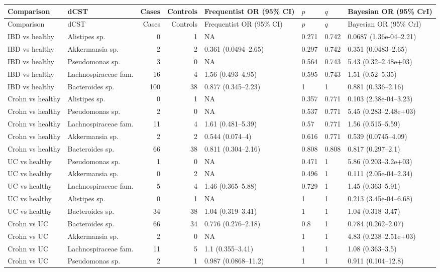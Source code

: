 \begingroup
\scriptsize
\setlength{\tabcolsep}{3pt}
\setlength{\LTleft}{0pt}
\setlength{\LTright}{0pt}
\begin{longtable}{@{} p{} p{} r r p{} p{} p{} p{} @{}}
\toprule
Comparison & dCST & Cases & Controls & Frequentist OR (95\% CI) & \(p\) & \(q\) & Bayesian OR (95\% CrI) \\
\midrule
\endfirsthead
\toprule
Comparison & dCST & Cases & Controls & Frequentist OR (95\% CI) & \(p\) & \(q\) & Bayesian OR (95\% CrI) \\
\midrule
\endhead
\bottomrule
\endfoot
IBD vs healthy & Alistipes sp. & 0 & 1 & NA & 0.271 & 0.742 & 0.0687 (1.36e-04--2.21) \\
IBD vs healthy & Akkermansia sp. & 2 & 2 & 0.361 (0.0494--2.65) & 0.297 & 0.742 & 0.351 (0.0483--2.65) \\
IBD vs healthy & Pseudomonas sp. & 3 & 0 & NA & 0.564 & 0.743 & 5.43 (0.32--2.48e+03) \\
IBD vs healthy & Lachnospiraceae fam. & 16 & 4 & 1.56 (0.493--4.95) & 0.595 & 0.743 & 1.51 (0.52--5.35) \\
IBD vs healthy & Bacteroides sp. & 100 & 38 & 0.877 (0.345--2.23) & 1 & 1 & 0.881 (0.336--2.16) \\
Crohn vs healthy & Alistipes sp. & 0 & 1 & NA & 0.357 & 0.771 & 0.103 (2.38e-04--3.23) \\
Crohn vs healthy & Pseudomonas sp. & 2 & 0 & NA & 0.537 & 0.771 & 5.45 (0.283--2.48e+03) \\
Crohn vs healthy & Lachnospiraceae fam. & 11 & 4 & 1.61 (0.481--5.39) & 0.57 & 0.771 & 1.56 (0.515--5.59) \\
Crohn vs healthy & Akkermansia sp. & 2 & 2 & 0.544 (0.074--4) & 0.616 & 0.771 & 0.539 (0.0745--4.09) \\
Crohn vs healthy & Bacteroides sp. & 66 & 38 & 0.811 (0.304--2.16) & 0.808 & 0.808 & 0.817 (0.297--2.1) \\
UC vs healthy & Pseudomonas sp. & 1 & 0 & NA & 0.471 & 1 & 5.86 (0.203--3.2e+03) \\
UC vs healthy & Akkermansia sp. & 0 & 2 & NA & 0.496 & 1 & 0.111 (2.05e-04--2.34) \\
UC vs healthy & Lachnospiraceae fam. & 5 & 4 & 1.46 (0.365--5.88) & 0.729 & 1 & 1.45 (0.363--5.91) \\
UC vs healthy & Alistipes sp. & 0 & 1 & NA & 1 & 1 & 0.213 (3.45e-04--6.68) \\
UC vs healthy & Bacteroides sp. & 34 & 38 & 1.04 (0.319--3.41) & 1 & 1 & 1.04 (0.318--3.47) \\
Crohn vs UC & Bacteroides sp. & 66 & 34 & 0.776 (0.276--2.18) & 0.8 & 1 & 0.784 (0.262--2.07) \\
Crohn vs UC & Akkermansia sp. & 2 & 0 & NA & 1 & 1 & 4.83 (0.238--2.51e+03) \\
Crohn vs UC & Lachnospiraceae fam. & 11 & 5 & 1.1 (0.355--3.41) & 1 & 1 & 1.08 (0.363--3.5) \\
Crohn vs UC & Pseudomonas sp. & 2 & 1 & 0.987 (0.0868--11.2) & 1 & 1 & 0.911 (0.104--12.8) \\
\end{longtable}
\endgroup
\bigskip

